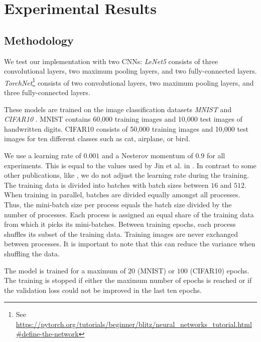 \documentclass[conference,compsoc,a4paper]{IEEEtran}
\begin{document}

\section{Experimental Results} %
\label{sec:experimental_results}

\subsection{Methodology} %
\label{sub:methodology}

We test our implementation with two CNNs:
\emph{LeNet5} \cite{lecun1998gradient} consists of three convolutional layers, two maximum pooling layers, and two fully-connected layers.
\emph{TorchNet}\footnote{See \url{https://pytorch.org/tutorials/beginner/blitz/neural_networks_tutorial.html\#define-the-network}} consists of two convolutional layers, two maximum pooling layers, and three fully-connected layers.

These models are trained on the image classification datasets \emph{MNIST} \cite{lecun1998gradient} and \emph{CIFAR10} \cite{krizhevsky2009CIFAR10}.
MNIST contains 60,000 training images and 10,000 test images of handwritten digits.
CIFAR10 consists of 50,000 training images and 10,000 test images for ten different classes such as cat, airplane, or bird.

We use a learning rate of $0.001$ and a Nesterov momentum of $0.9$ for all experiments.
This is equal to the values used by Jin et al. in \cite{jin2016-How-to-scale}.
In contrast to some other publications, like \cite{jin2016-How-to-scale}, we do not adjust the learning rate during the training.
%
The training data is divided into batches with batch sizes between $16$ and $512$.
When training in parallel, batches are divided equally amongst all processes.
Thus, the mini-batch size per process equals the batch size divided by the number of processes.
%
Each process is assigned an equal share of the training data from which it picks its mini-batches.
Between training epochs, each process shuffles its subset of the training data.
Training images are never exchanged between processes.
It is important to note that this can reduce the variance when shuffling the data.

The model is trained for a maximum of $20$ (MNIST) or $100$ (CIFAR10) epochs.
The training is stopped if either the maximum number of epochs is reached or if the validation loss could not be improved in the last ten epochs.
\end{document}
